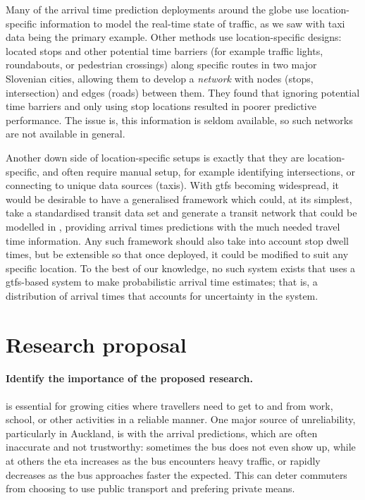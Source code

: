 Many of the arrival time prediction deployments around the globe use location-specific information to model the real-time state of traffic, as we saw with taxi data being the primary example. Other methods use location-specific designs: \citet{Celan_2017,Celan_2018} located stops and other potential time barriers (for example traffic lights, roundabouts, or pedestrian crossings) along specific routes in two major Slovenian cities, allowing them to develop a \emph{network} with nodes (stops, intersection) and edges (roads) between them. They found that ignoring potential time barriers and only using stop locations resulted in poorer predictive performance. The issue is, this information is seldom available, so such networks are not available in general.


Another down side of location-specific setups is exactly that they are location-specific, and often require manual setup, for example identifying intersections, or connecting to unique data sources (taxis). With \gls{gtfs} becoming widespread, it would be desirable to have a generalised framework which could, at its simplest, take a standardised transit data set and generate a transit network that could be modelled in \rt{}, providing arrival times predictions with the much needed travel time information. Any such framework should also take into account stop dwell times, but be extensible so that once deployed, it could be modified to suit any specific location. To the best of our knowledge, no such system exists that uses a \gls{gtfs}-based system to make probabilistic arrival time estimates; that is, a distribution of arrival times that accounts for uncertainty in the system.


\section{Research proposal}
\label{eq:proposal}

\paragraph{Identify the importance of the proposed research.}
\PT{} is essential for growing cities where travellers need to get to and from work, school, or other activities in a reliable manner. One major source of unreliability, particularly in Auckland, is with the \rt{} arrival predictions, which are often inaccurate and not trustworthy: sometimes the bus does not even show up, while at others the \gls{eta} increases as the bus encounters heavy traffic, or rapidly decreases as the bus approaches faster the expected. This can deter commuters from choosing to use public transport and prefering private means.


